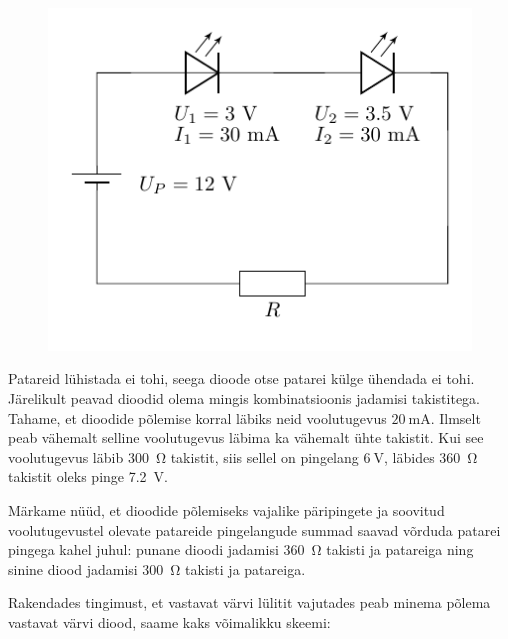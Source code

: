 \documentclass[10pt]{article}
\begin{document}
\begin{figure}[h]
    \centering
    \includegraphics[width=0.5\linewidth]{2024-v2g-03-yl.pdf}
\end{figure}
\probend
\bigskip


\solu
Patareid lühistada ei tohi, seega dioode otse patarei külge ühendada ei tohi. Järelikult peavad dioodid olema mingis kombinatsioonis jadamisi takistitega. Tahame, et dioodide põlemise korral läbiks neid voolutugevus $\SI{20}{\mA}$. Ilmselt peab vähemalt selline voolutugevus läbima ka vähemalt ühte takistit. Kui see voolutugevus läbib \SI{300}{\ohm} takistit, siis sellel on pingelang $\SI{6}{\V}$, läbides \SI{360}{\ohm} takistit oleks pinge \SI{7.2}{\V}.

Märkame nüüd, et dioodide põlemiseks vajalike päripingete ja soovitud voolutugevustel olevate patareide pingelangude summad saavad võrduda patarei pingega kahel juhul: punane dioodi jadamisi \SI{360}{\ohm} takisti ja patareiga ning sinine diood jadamisi \SI{300}{\ohm} takisti ja patareiga.

Rakendades tingimust, et vastavat värvi lülitit vajutades peab minema põlema vastavat värvi diood, saame kaks võimalikku skeemi:
\begin{center}
  \hspace{-1cm}
\end{center}
\end{document}
